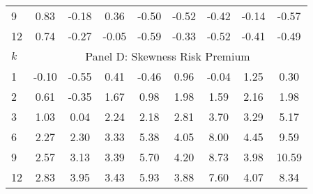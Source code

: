 \documentclass[11pt]{article}
\begin{document}
\begin{table}
\begin{center}
\begin{tabular}{lllllllll}
9 & \multicolumn{1}{c}{0.83} & \multicolumn{1}{c}{-0.18} & \multicolumn{1}{c}{0.36} & \multicolumn{1}{c}{-0.50} & \multicolumn{1}{c}{-0.52} & \multicolumn{1}{c}{-0.42} & \multicolumn{1}{c}{-0.14} & \multicolumn{1}{c}{-0.57} \\
12 & \multicolumn{1}{c}{0.74} & \multicolumn{1}{c}{-0.27} & \multicolumn{1}{c}{-0.05} & \multicolumn{1}{c}{-0.59} & \multicolumn{1}{c}{-0.33} & \multicolumn{1}{c}{-0.52} & \multicolumn{1}{c}{-0.41} & \multicolumn{1}{c}{-0.49} \\
\hline
$k$ & \multicolumn{8}{c}{Panel D: Skewness Risk Premium} \\
\hline
1 & \multicolumn{1}{c}{-0.10} & \multicolumn{1}{c}{-0.55} & \multicolumn{1}{c}{0.41} & \multicolumn{1}{c}{-0.46} & \multicolumn{1}{c}{0.96} & \multicolumn{1}{c}{-0.04} & \multicolumn{1}{c}{1.25} & \multicolumn{1}{c}{0.30} \\
2 & \multicolumn{1}{c}{0.61} & \multicolumn{1}{c}{-0.35} & \multicolumn{1}{c}{1.67} & \multicolumn{1}{c}{0.98} & \multicolumn{1}{c}{1.98} & \multicolumn{1}{c}{1.59} & \multicolumn{1}{c}{2.16} & \multicolumn{1}{c}{1.98} \\
3 & \multicolumn{1}{c}{1.03} & \multicolumn{1}{c}{0.04} & \multicolumn{1}{c}{2.24} & \multicolumn{1}{c}{2.18} & \multicolumn{1}{c}{2.81} & \multicolumn{1}{c}{3.70} & \multicolumn{1}{c}{3.29} & \multicolumn{1}{c}{5.17} \\
6 & \multicolumn{1}{c}{2.27} & \multicolumn{1}{c}{2.30} & \multicolumn{1}{c}{3.33} & \multicolumn{1}{c}{5.38} & \multicolumn{1}{c}{4.05} & \multicolumn{1}{c}{8.00} & \multicolumn{1}{c}{4.45} & \multicolumn{1}{c}{9.59} \\
9 & \multicolumn{1}{c}{2.57} & \multicolumn{1}{c}{3.13} & \multicolumn{1}{c}{3.39} & \multicolumn{1}{c}{5.70} & \multicolumn{1}{c}{4.20} & \multicolumn{1}{c}{8.73} & \multicolumn{1}{c}{3.98} & \multicolumn{1}{c}{10.59} \\
12 & \multicolumn{1}{c}{2.83} & \multicolumn{1}{c}{3.95} & \multicolumn{1}{c}{3.43} & \multicolumn{1}{c}{5.93} & \multicolumn{1}{c}{3.88} & \multicolumn{1}{c}{7.60} & \multicolumn{1}{c}{4.07} & \multicolumn{1}{c}{8.34} \\
\hline
\end{tabular}
  \end{center}

\end{table}
\end{document}
